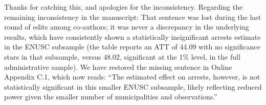 

Thanks for catching this, and apologies for the inconsistency. Regarding the remaining inconsistency in the manuscript: That sentence was lost during the last round of edits among co-authors; it was never a discrepancy in the underlying results, which have consistently shown a statistically insignificant arrests estimate in the ENUSC subsample (the table reports an ATT of 44.09 with no significance stars in that subsample, versus 48.02, significant at the 1\% level, in the full administrative sample). We have restored the missing sentence in Online Appendix C.1, which now reads: ``The estimated effect on arrests, however, is not statistically significant in this smaller ENUSC subsample, likely reflecting reduced power given the smaller number of municipalities and observations.''

